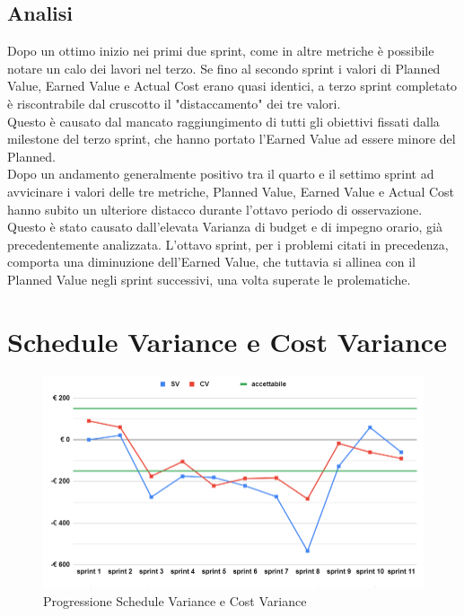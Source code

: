 \subsection{Analisi}
Dopo un ottimo inizio nei primi due sprint, come in altre metriche è possibile notare un calo dei lavori nel terzo. Se fino al secondo sprint i valori di Planned Value, Earned Value e Actual Cost erano quasi identici, a terzo sprint completato è riscontrabile dal cruscotto il "distaccamento" dei tre valori.\\
Questo è causato dal mancato raggiungimento di tutti gli obiettivi fissati dalla milestone del terzo sprint, che hanno portato l'Earned Value ad essere minore del Planned.\\
Dopo un andamento generalmente positivo tra il quarto e il settimo sprint ad avvicinare i valori delle tre metriche, Planned Value, Earned Value e Actual Cost hanno subito un ulteriore distacco durante l'ottavo periodo di osservazione. Questo è stato causato dall'elevata Varianza di budget e di impegno orario, già precedentemente analizzata.
L'ottavo sprint, per i problemi citati in precedenza, comporta una diminuzione dell'Earned Value, che tuttavia si allinea con il Planned Value negli sprint successivi, una volta superate le prolematiche.

\section{Schedule Variance e Cost Variance}
\begin{figure}[H]
    \centering
    \includegraphics[width=0.8\linewidth]{SVCV.png}
    \caption{Progressione Schedule Variance e Cost Variance}
\end{figure}
